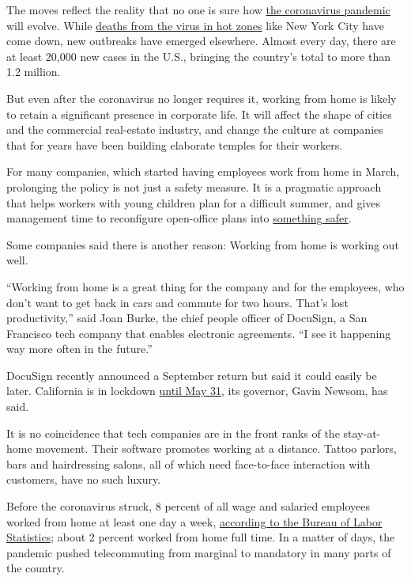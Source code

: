 The moves reflect the reality that no one is sure how
\href{https://www.nytimes.com/news-event/coronavirus?action=click\&pgtype=Article\&state=default\&module=STYLN_coronahub\&variant=show\&region=header\&context=menu}{the
coronavirus pandemic} will evolve. While
\href{https://www.nytimes.com/2020/05/05/us/coronavirus-deaths-cases-united-states.html}{deaths
from the virus in hot zones} like New York City have come down, new
outbreaks have emerged elsewhere. Almost every day, there are at least
20,000 new cases in the U.S., bringing the country's total to more than
1.2 million.

But even after the coronavirus no longer requires it, working from home
is likely to retain a significant presence in corporate life. It will
affect the shape of cities and the commercial real-estate industry, and
change the culture at companies that for years have been building
elaborate temples for their workers.

For many companies, which started having employees work from home in
March, prolonging the policy is not just a safety measure. It is a
pragmatic approach that helps workers with young children plan for a
difficult summer, and gives management time to reconfigure open-office
plans into
\href{https://www.nytimes.com/2020/05/04/health/coronavirus-office-makeover.html}{something
safer}.

Some companies said there is another reason: Working from home is
working out well.

``Working from home is a great thing for the company and for the
employees, who don't want to get back in cars and commute for two hours.
That's lost productivity,'' said Joan Burke, the chief people officer of
DocuSign, a San Francisco tech company that enables electronic
agreements. ``I see it happening way more often in the future.''

DocuSign recently announced a September return but said it could easily
be later. California is in lockdown
\href{https://www.mercurynews.com/2020/04/27/bay-areas-shelter-in-place-to-last-through-may/}{until
May 31}, its governor, Gavin Newsom, has said.

It is no coincidence that tech companies are in the front ranks of the
stay-at-home movement. Their software promotes working at a distance.
Tattoo parlors, bars and hairdressing salons, all of which need
face-to-face interaction with customers, have no such luxury.

Before the coronavirus struck, 8 percent of all wage and salaried
employees worked from home at least one day a week,
\href{https://www.bls.gov/news.release/flex2.t03.htm}{according to the
Bureau of Labor Statistics}; about 2 percent worked from home full time.
In a matter of days, the pandemic pushed telecommuting from marginal to
mandatory in many parts of the country.

